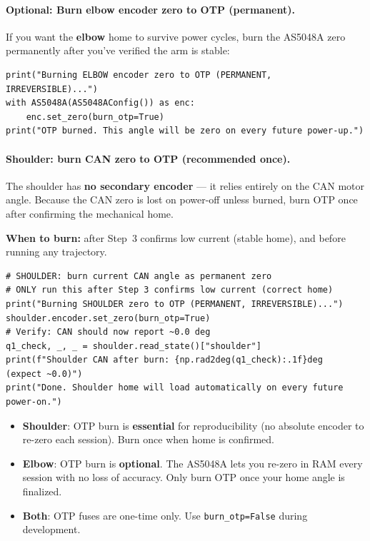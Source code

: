 \documentclass[11pt,a4paper]{article}
\begin{document}
\paragraph{Optional: Burn elbow encoder zero to OTP (permanent).}
If you want the \textbf{elbow} home to survive power cycles, burn the AS5048A zero permanently
after you've verified the arm is stable:

\begin{lstlisting}[caption={Permanently burn elbow OTP zero (one-time only).}]
print("Burning ELBOW encoder zero to OTP (PERMANENT, IRREVERSIBLE)...")
with AS5048A(AS5048AConfig()) as enc:
    enc.set_zero(burn_otp=True)
print("OTP burned. This angle will be zero on every future power-up.")
\end{lstlisting}

\paragraph{Shoulder: burn CAN zero to OTP (recommended once).}
The shoulder has \textbf{no secondary encoder} --- it relies entirely on the CAN motor angle.
Because the CAN zero is lost on power-off unless burned, burn OTP once
after confirming the mechanical home.

\textbf{When to burn:} after Step~3 confirms low current (stable home), and before
running any trajectory.

\begin{lstlisting}[caption={Burn shoulder home to OTP --- run once only.}]
# SHOULDER: burn current CAN angle as permanent zero
# ONLY run this after Step 3 confirms low current (correct home)
print("Burning SHOULDER zero to OTP (PERMANENT, IRREVERSIBLE)...")
shoulder.encoder.set_zero(burn_otp=True)
# Verify: CAN should now report ~0.0 deg
q1_check, _, _ = shoulder.read_state()["shoulder"]
print(f"Shoulder CAN after burn: {np.rad2deg(q1_check):.1f}deg  (expect ~0.0)")
print("Done. Shoulder home will load automatically on every future power-on.")
\end{lstlisting}

\begin{tcolorbox}[colback=orange!5, colframe=orange!60, title=\textbf{Shoulder vs Elbow: OTP lifetime rule}]
\begin{itemize}[leftmargin=1.5em]
  \item \textcolor{blue!70!black}{\textbf{Shoulder}}: OTP burn is \textbf{essential} for reproducibility
        (no absolute encoder to re-zero each session).  Burn once when home is confirmed.
  \item \textcolor{green!50!black}{\textbf{Elbow}}: OTP burn is \textbf{optional}.
        The AS5048A lets you re-zero in RAM every session with no loss of accuracy.
        Only burn OTP once your home angle is finalized.
  \item \textbf{Both}: OTP fuses are one-time only.  Use \texttt{burn\_otp=False} during development.
\end{itemize}
\end{tcolorbox}
\end{document}
